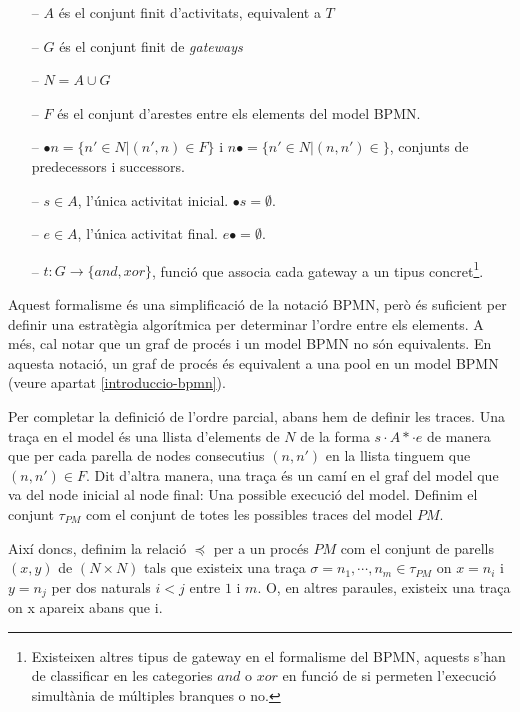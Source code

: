 \begin{itemize}
    \item[--] $A$ és el conjunt finit d'activitats, equivalent a $T$
    \item[--] $G$ és el conjunt finit de \emph{gateways}
    \item[--] $N = A\cup G$
    \item[--] $F$ és el conjunt d'arestes entre els elements del model BPMN.
    \item[--] $\bullet n = \{n' \in N | (n',n) \in F\}$ i $n\bullet = \{n' \in N | (n, n') \in \}$, conjunts de predecessors i successors.
    \item[--] $s \in A$, l'única activitat inicial. $\bullet s = \emptyset$.
    \item[--] $e \in A$, l'única activitat final. $e\bullet = \emptyset$.
    \item[--] $t : G \rightarrow \{and, xor\}$, funció que associa cada gateway a un tipus concret\footnote{Existeixen altres tipus de gateway en el formalisme del BPMN, aquests s'han de classificar en les categories $and$ o $xor$ en funció de si permeten l'execució simultània de múltiples branques o no.}.
\end{itemize}

Aquest formalisme és una simplificació de la notació BPMN, però és suficient per definir una estratègia algorítmica per determinar l'ordre entre els elements. A més, cal notar que un graf de procés i un model BPMN no són equivalents. En aquesta notació, un graf de procés és equivalent a una pool en un model BPMN (veure apartat \ref{introduccio-bpmn}).

Per completar la definició de l'ordre parcial, abans hem de definir les traces. Una traça en el model és una llista d'elements de $N$ de la forma $s \cdot A* \cdot e$ de manera que per cada parella de nodes consecutius $(n, n')$ en la llista tinguem que $(n, n') \in F$. Dit d'altra manera, una traça és un camí en el graf del model que va del node inicial al node final: Una possible execució del model. Definim el conjunt $\tau _{PM}$ com el conjunt de totes les possibles traces del model $PM$.

Així doncs, definim la relació $\preceq$ per a un procés $PM$ com el conjunt de parells $(x,y)$ de $(N\times N)$ tals que existeix una traça $\sigma = n_1, \cdots, n_m \in \tau _{PM}$ on $x=n_i$ i $y=n_j$ per dos naturals $i < j$ entre $1$ i $m$. O, en altres paraules, existeix una traça on x apareix abans que i.

